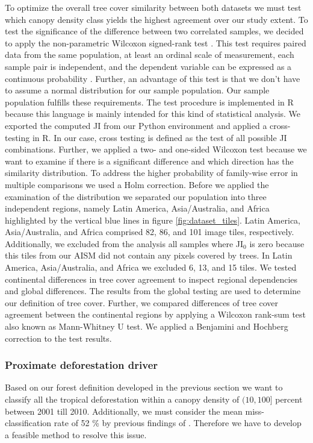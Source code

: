 			To optimize the overall tree cover similarity between both datasets we must test which canopy density class yields the highest agreement over our study extent. To test the significance of the difference between two correlated samples, we decided to apply the non-parametric Wilcoxon signed-rank test \citep{Wilcoxon1945}. This test requires paired data from the same population, at least an ordinal scale of measurement, each sample pair is independent, and the dependent variable can be expressed as a continuous probability \citep{Lowry2019}. Further, an advantage of this test is that we don't have to assume a normal distribution for our sample population. Our sample population fulfills these requirements.  The test procedure is implemented in R because this language is mainly intended for this kind of statistical analysis. We exported the computed \ac{JI} from our Python environment and applied a cross-testing in R. In our case, cross testing is defined as the test of all possible \ac{JI} combinations. Further, we applied a two- and one-sided Wilcoxon test because we want to examine if there is a significant difference and which direction has the similarity distribution. To address the higher probability of family-wise error in multiple comparisons we used a Holm correction. Before we applied the examination of the distribution we separated our population into three independent regions, namely Latin America, Asia/Australia, and Africa highlighted by the vertical blue lines in figure \ref{fig:dataset_tiles}. Latin America, Asia/Australia, and Africa comprised 82, 86, and 101 image tiles, respectively. Additionally, we excluded from the analysis all samples where JI$_0$ is zero because this tiles from our \ac{AISM} did not contain any pixels covered by trees. In Latin America, Asia/Australia, and Africa we excluded 6, 13, and 15 tiles. We tested continental differences in tree cover agreement to inspect regional dependencies and global differences. The results from the global testing are used to determine our definition of tree cover. Further, we compared differences of tree cover agreement between the continental regions by applying a Wilcoxon rank-sum test also known as Mann-Whitney U test. We applied a Benjamini and Hochberg correction to the test results.
 
		\subsubsection{Proximate deforestation driver}
		\label{subsubsec:methods_proximate_deforestation_driver}
			Based on our forest definition developed in the previous section we want to classify all the tropical deforestation within a canopy density of $(10,100]$ percent between 2001 till 2010. Additionally, we must consider the mean miss-classification rate of 52 \% by previous findings of \citeauthor{Seydewitz2017} \citep{Seydewitz2017}. Therefore we have to develop a feasible method to resolve this issue.

